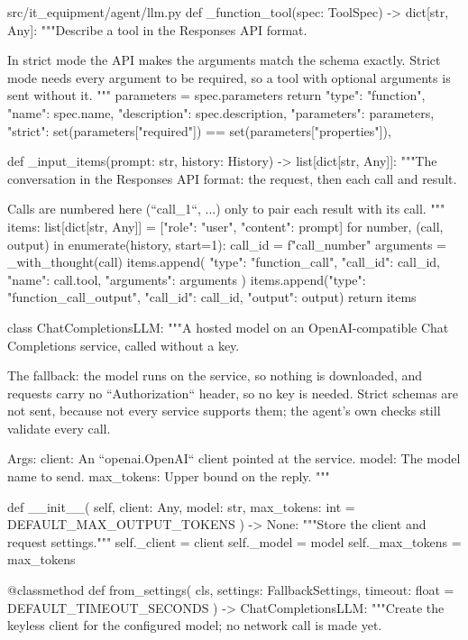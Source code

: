 \documentclass[11pt,letterpaper]{article}
\renewcommand{\_}{\textunderscore\allowbreak}
\begin{document}
\begin{codebox}{src/it_equipment/agent/llm.py}
def _function_tool(spec: ToolSpec) -> dict[str, Any]:
    """Describe a tool in the Responses API format.

    In strict mode the API makes the arguments match the schema exactly. Strict mode needs
    every argument to be required, so a tool with optional arguments is sent without it.
    """
    parameters = spec.parameters
    return {
        "type": "function",
        "name": spec.name,
        "description": spec.description,
        "parameters": parameters,
        "strict": set(parameters["required"]) == set(parameters["properties"]),
    }


def _input_items(prompt: str, history: History) -> list[dict[str, Any]]:
    """The conversation in the Responses API format: the request, then each call and result.

    Calls are numbered here (``call_1``, ...) only to pair each result with its call.
    """
    items: list[dict[str, Any]] = [{"role": "user", "content": prompt}]
    for number, (call, output) in enumerate(history, start=1):
        call_id = f"call_{number}"
        arguments = _with_thought(call)
        items.append(
            {"type": "function_call", "call_id": call_id, "name": call.tool, "arguments": arguments}
        )
        items.append({"type": "function_call_output", "call_id": call_id, "output": output})
    return items


class ChatCompletionsLLM:
    """A hosted model on an OpenAI-compatible Chat Completions service, called without a key.

    The fallback: the model runs on the service, so nothing is downloaded, and requests carry
    no ``Authorization`` header, so no key is needed. Strict schemas are not sent, because not
    every service supports them; the agent's own checks still validate every call.

    Args:
        client: An ``openai.OpenAI`` client pointed at the service.
        model: The model name to send.
        max_tokens: Upper bound on the reply.
    """

    def __init__(
        self, client: Any, model: str, max_tokens: int = DEFAULT_MAX_OUTPUT_TOKENS
    ) -> None:
        """Store the client and request settings."""
        self._client = client
        self._model = model
        self._max_tokens = max_tokens

    @classmethod
    def from_settings(
        cls, settings: FallbackSettings, timeout: float = DEFAULT_TIMEOUT_SECONDS
    ) -> ChatCompletionsLLM:
        """Create the keyless client for the configured model; no network call is made yet.


\end{codebox}
\end{document}
